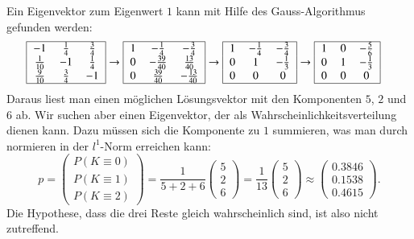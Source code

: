 Ein Eigenvektor zum Eigenwert $1$ kann mit Hilfe des Gauss-Algorithmus
gefunden werden:
\begin{align*}
\begin{tabular}{|>{$}c<{$}>{$}c<{$}>{$}c<{$}|}
\hline
-1         &\frac14 &\frac34 \\
\frac1{10} &-1      &\frac14 \\
\frac9{10} &\frac34 &-1      \\
\hline
\end{tabular}
&\rightarrow
\begin{tabular}{|>{$}c<{$}>{$}c<{$}>{$}c<{$}|}
\hline
1          &-\frac14       &-\frac34       \\
0          &-\frac{39}{40} & \frac{13}{40} \\
0          & \frac{39}{40} &-\frac{13}{40} \\
\hline
\end{tabular}
\rightarrow
\begin{tabular}{|>{$}c<{$}>{$}c<{$}>{$}c<{$}|}
\hline
1 &-\frac14 &-\frac34 \\
0 & 1       &-\frac13 \\
0 & 0       & 0       \\
\hline
\end{tabular}
\rightarrow
\begin{tabular}{|>{$}c<{$}>{$}c<{$}>{$}c<{$}|}
\hline
1 & 0 &-\frac56 \\
0 & 1 &-\frac13 \\
0 & 0 & 0       \\
\hline
\end{tabular}
\end{align*}
Daraus liest man einen möglichen Lösungsvektor mit den Komponenten
$5$, $2$ und $6$ ab.
Wir suchen aber einen Eigenvektor, der als Wahrscheinlichkeitsverteilung
dienen kann.
Dazu müssen sich die Komponente zu $1$ summieren, was man durch normieren
in der $l^1$-Norm erreichen kann:
\begin{equation}
p
=
\begin{pmatrix}
P(K\equiv 0)\\
P(K\equiv 1)\\
P(K\equiv 2)
\end{pmatrix}
=
\frac{1}{5+2+6}
\begin{pmatrix}
5\\2\\6
\end{pmatrix}
=
\frac{1}{13}
\begin{pmatrix}
5\\2\\6
\end{pmatrix}
\approx
\begin{pmatrix}
   0.3846 \\
   0.1538 \\
   0.4615
\end{pmatrix}.
\label{buch:wahrscheinlichkeit:spielBP}
\end{equation}
Die Hypothese, dass die drei Reste gleich wahrscheinlich sind, ist
also nicht zutreffend.

